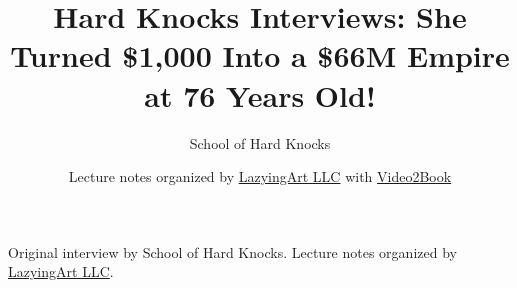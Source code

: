\documentclass[11pt,oneside]{book}
\begin{document}
\frontmatter
\title{Hard Knocks Interviews: She Turned \$1,000 Into a \$66M Empire at 76 Years Old!}
\author{School of Hard Knocks}
\date{Lecture notes organized by \href{https://lazying.art}{LazyingArt LLC} with \href{https://github.com/lachlanchen/Video2Book}{Video2Book}}
\maketitle
\begin{center}
\small Original interview by School of Hard Knocks. Lecture notes organized by \href{https://lazying.art}{LazyingArt LLC}.
\end{center}
\clearpage
\mainmatter

\end{document}
